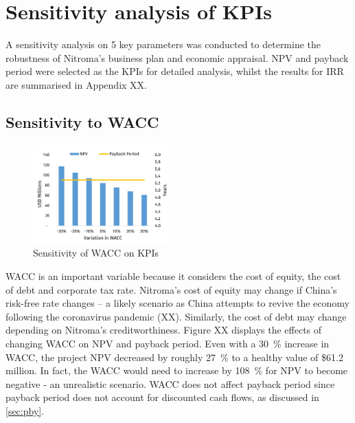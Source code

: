 \section{Sensitivity analysis of KPIs}
\label{sec:sensitivities-kpis}
A sensitivity analysis on 5 key parameters was conducted to determine the robustness of Nitroma’s business plan and economic appraisal. NPV and payback period were selected as the KPIs for detailed analysis, whilst the results for IRR are summarised in Appendix XX. 

\subsection{Sensitivity to WACC}
\begin{figure}
    \vspace{-0.9cm}
    \caption{Sensitivity of WACC on KPIs}
    \label{Sensitivity_WACC}
    \includegraphics[width=0.47\textwidth]{chapters/6-economics/figures/Sensitivity_WACC.jpg}
\end{figure}
WACC is an important variable because it considers the cost of equity, the cost of debt and corporate tax rate. Nitroma’s cost of equity may change if China’s risk-free rate changes – a likely scenario as China attempts to revive the economy following the coronavirus pandemic (XX). Similarly, the cost of debt may change depending on Nitroma’s creditworthiness.  Figure XX displays the effects of changing WACC on NPV and payback period. Even with a \SI{30}{\percent} increase in WACC, the project NPV decreased by roughly \SI{27}{\percent} to a healthy value of \$61.2 million. In fact, the WACC would need to increase by \SI{108}{\percent} for NPV to become negative - an unrealistic scenario. WACC does not affect payback period since payback period does not account for discounted cash flows, as discussed in \cref{sec:pby}. 



